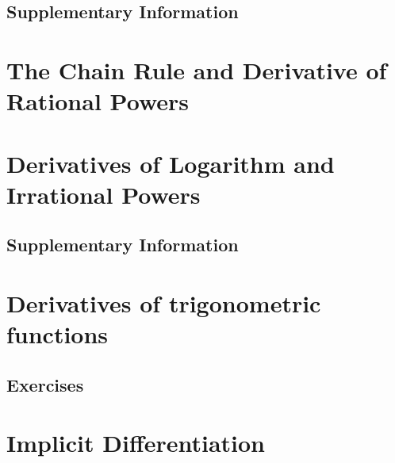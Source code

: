\documentclass{fts_m2}
\begin{document}
    \subsection*{Supplementary Information}
    
    \fi

    \section{The Chain Rule and Derivative of Rational Powers}
    

    \section{Derivatives of Logarithm and Irrational Powers}
    
    \ifcompilesupp
    \subsection*{Supplementary Information}
    
    \fi
    
    \section{Derivatives of trigonometric functions}
    
    \ifcompilesupp
    \subsection*{Exercises}
    
    \fi
    
    \section{Implicit Differentiation}
    

\end{document}
